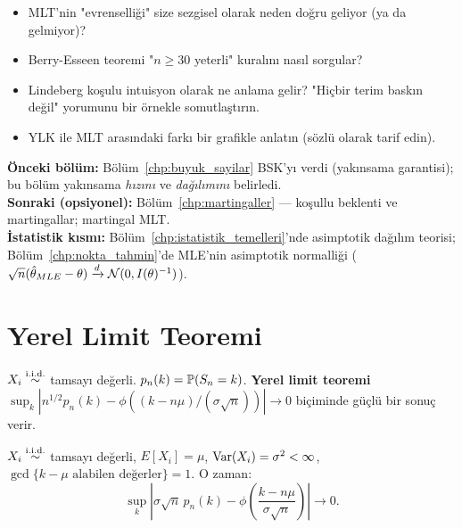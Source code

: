 \begin{ozyansima}
\begin{itemize}
  \item MLT'nin "evrenselliği" size sezgisel olarak neden doğru geliyor (ya da gelmiyor)?
  \item Berry-Esseen teoremi "$n \geq 30$ yeterli" kuralını nasıl sorgular?
  \item Lindeberg koşulu intuisyon olarak ne anlama gelir?
        "Hiçbir terim baskın değil" yorumunu bir örnekle somutlaştırın.
  \item YLK ile MLT arasındaki farkı bir grafikle anlatın (sözlü olarak tarif edin).
\end{itemize}
\end{ozyansima}

\begin{kopru}
\textbf{Önceki bölüm:} Bölüm~\ref{chp:buyuk_sayilar} BSK'yı verdi (yakınsama garantisi);
bu bölüm yakınsama \emph{hızını} ve \emph{dağılımını} belirledi.\\
\textbf{Sonraki (opsiyonel):} Bölüm~\ref{chp:martingaller} --- koşullu beklenti
ve martingallar; martingal MLT.\\
\textbf{İstatistik kısmı:} Bölüm~\ref{chp:istatistik_temelleri}'nde asimptotik
dağılım teorisi; Bölüm~\ref{chp:nokta_tahmin}'de MLE'nin asimptotik normalliği
($\sqrt{n}(\hat\theta_{MLE}-\theta) \xrightarrow{d} \mathcal{N}(0, I(\theta)^{-1})$).
\end{kopru}

\section{Yerel Limit Teoremi}
\label{sec:yerel_limit}

\begin{tanim}\label{def:yerel_limit}
$X_i\overset{\text{i.i.d.}}{\sim}$ tamsayı değerli. $p_n(k)=\mathbb{P}(S_n=k)$. \textbf{Yerel limit teoremi} $\sup_k|n^{1/2}p_n(k)-\phi((k-n\mu)/(\sigma\sqrt{n}))|\to0$ biçiminde güçlü bir sonuç verir.
\end{tanim}

\begin{teorem}\label{thm:yerel_mlt}
$X_i\overset{\text{i.i.d.}}{\sim}$ tamsayı değerli, $E[X_i]=\mu$, $\operatorname{Var}(X_i)=\sigma^2<\infty$, $\gcd\{k-\mu\text{ alabilen değerler}\}=1$. O zaman:
\[
  \sup_k\!\left|\sigma\sqrt{n}\,p_n(k) - \phi\!\left(\frac{k-n\mu}{\sigma\sqrt{n}}\right)\right| \to 0.
\]
\end{teorem}

